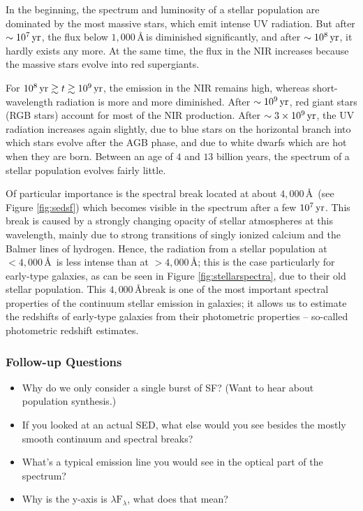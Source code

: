 \documentclass[a4paper,10pt]{article}
\begin{document}
{\noindent}In the beginning, the spectrum and luminosity of a stellar population are dominated by the most massive stars, which emit intense UV radiation. But after $\sim10^7\,{\rm yr}$, the flux below $1,000$\,\AA\,is diminished significantly, and after $\sim10^8\,{\rm yr}$, it hardly exists any more. At the same time, the flux in the NIR increases because the massive stars evolve into red supergiants.

{\noindent}For $10^8\,{\rm yr}\gtrsim t\gtrsim10^9\,{\rm yr}$, the emission in the NIR remains high, whereas short-wavelength radiation is more and more diminished. After $\sim10^9\,{\rm yr}$, red giant stars (RGB stars) account for most of the NIR production. After $\sim3\times10^9\,{\rm yr}$, the UV radiation increases again slightly, due to blue stars on the horizontal branch into which stars evolve after the AGB phase, and due to white dwarfs which are hot when they are born. Between an age of $4$ and $13$ billion years, the spectrum of a stellar population evolves fairly little. 

{\noindent}Of particular importance is the spectral break located at about $4,000$\,\AA~(see Figure \ref{fig:sedsf}) which becomes visible in the spectrum after a few $10^7\,{\rm yr}$. This break is caused by a strongly changing opacity of stellar atmospheres at this wavelength, mainly due to strong transitions of singly ionized calcium and the Balmer lines of hydrogen. Hence, the radiation from a stellar population at $<4,000$\,\AA~is less intense than at $>4,000$\,\AA; this is the case particularly for early-type galaxies, as can be seen in Figure \ref{fig:stellarspectra}, due to their old stellar population. This $4,000$\,\AA break is one of the most important spectral properties of the continuum stellar emission in galaxies; it allows us to estimate the redshifts of early-type galaxies from their photometric properties -- so-called photometric redshift estimates.

\subsubsection{Follow-up Questions}

\begin{itemize}
    \item Why do we only consider a single burst of SF? (Want to hear about population synthesis.)
    \item If you looked at an actual SED, what else would you see besides the mostly smooth continuum and spectral breaks?
    \item What's a typical emission line you would see in the optical part of the spectrum?
    \item Why is the y-axis is $\lambda\mathrm{F}_\lambda$, what does that mean?
\end{itemize}
\end{document}
